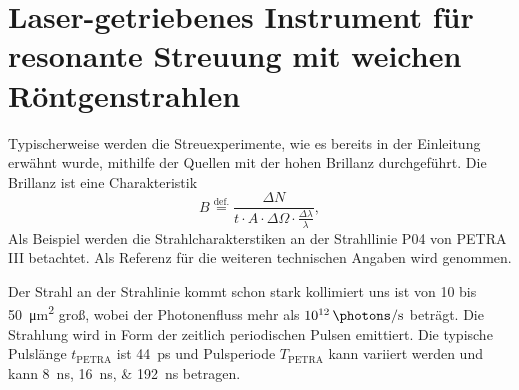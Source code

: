 \chapter{Laser-getriebenes Instrument für resonante Streuung mit weichen Röntgenstrahlen}
\label{text:quelle_roentgen}
Typischerweise werden die Streuexperimente, wie es bereits in der Einleitung erwähnt wurde, mithilfe der Quellen mit der hohen Brillanz durchgeführt. Die Brillanz ist eine Charakteristik
\begin{equation}
    B \stackrel{\text{def.}}{=} \frac{\Delta N}{t\cdot A \cdot \Delta \Omega \cdot \frac{\Delta \lambda}{\lambda}},
\end{equation}
\noindent
Als Beispiel werden die Strahlcharakterstiken an der Strahllinie P04 von PETRA III betachtet. Als Referenz für die weiteren technischen Angaben wird \cite{viefhaus_variable_2013} genommen.

\noindent
Der Strahl an der Strahlinie kommt schon stark kollimiert uns ist von 10 bis \SI{50}{\micro\meter\squared} groß, wobei der Photonenfluss mehr als $\SI{1e12}{\photons\per\second}$ \cite{viefhaus_variable_2013} beträgt. Die Strahlung wird in Form der zeitlich periodischen Pulsen emittiert. Die typische Pulslänge $t_\text{PETRA}$ ist \SI{44}{\pico\second} und Pulsperiode $T_\text{PETRA}$ kann variiert werden und kann \qtylist{8;16;192}{\nano\second} \cite{petra-values-website} betragen.

